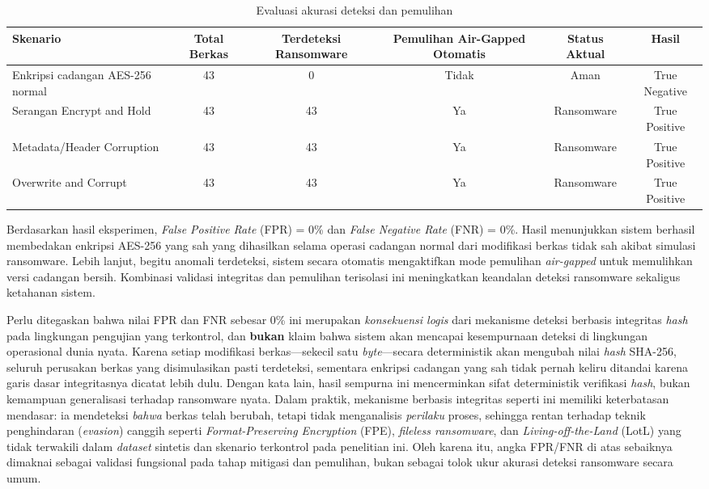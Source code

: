 \documentclass{iaesarticle}
\begin{document}
\begin{table}[H]
\centering
\fontsize{8pt}{10pt}\selectfont
\caption{Evaluasi akurasi deteksi dan pemulihan}
\label{tab:detection_accuracy}
\begin{tabularx}{\textwidth}{@{}X c c c c c@{}}
\hline
\textbf{Skenario} & \textbf{Total Berkas} & \textbf{Terdeteksi Ransomware} & \textbf{Pemulihan Air-Gapped Otomatis} & \textbf{Status Aktual} & \textbf{Hasil} \\
\hline
Enkripsi cadangan AES-256 normal & 43 & 0 & Tidak & Aman & True Negative \\
Serangan Encrypt and Hold & 43 & 43 & Ya & Ransomware & True Positive \\
Metadata/Header Corruption & 43 & 43 & Ya & Ransomware & True Positive \\
Overwrite and Corrupt & 43 & 43 & Ya & Ransomware & True Positive \\
\hline
\end{tabularx}
\end{table}

Berdasarkan hasil eksperimen, \textit{False Positive Rate} (FPR) = 0\% dan \textit{False Negative Rate} (FNR) = 0\%. Hasil menunjukkan sistem berhasil membedakan enkripsi AES-256 yang sah yang dihasilkan selama operasi cadangan normal dari modifikasi berkas tidak sah akibat simulasi ransomware. Lebih lanjut, begitu anomali terdeteksi, sistem secara otomatis mengaktifkan mode pemulihan \textit{air-gapped} untuk memulihkan versi cadangan bersih. Kombinasi validasi integritas dan pemulihan terisolasi ini meningkatkan keandalan deteksi ransomware sekaligus ketahanan sistem.

Perlu ditegaskan bahwa nilai FPR dan FNR sebesar 0\% ini merupakan \textit{konsekuensi logis} dari mekanisme deteksi berbasis integritas \textit{hash} pada lingkungan pengujian yang terkontrol, dan \textbf{bukan} klaim bahwa sistem akan mencapai kesempurnaan deteksi di lingkungan operasional dunia nyata. Karena setiap modifikasi berkas---sekecil satu \textit{byte}---secara deterministik akan mengubah nilai \textit{hash} SHA-256, seluruh perusakan berkas yang disimulasikan pasti terdeteksi, sementara enkripsi cadangan yang sah tidak pernah keliru ditandai karena garis dasar integritasnya dicatat lebih dulu. Dengan kata lain, hasil sempurna ini mencerminkan sifat deterministik verifikasi \textit{hash}, bukan kemampuan generalisasi terhadap ransomware nyata. Dalam praktik, mekanisme berbasis integritas seperti ini memiliki keterbatasan mendasar: ia mendeteksi \textit{bahwa} berkas telah berubah, tetapi tidak menganalisis \textit{perilaku} proses, sehingga rentan terhadap teknik penghindaran (\textit{evasion}) canggih seperti \textit{Format-Preserving Encryption} (FPE), \textit{fileless ransomware}, dan \textit{Living-off-the-Land} (LotL) yang tidak terwakili dalam \textit{dataset} sintetis dan skenario terkontrol pada penelitian ini. Oleh karena itu, angka FPR/FNR di atas sebaiknya dimaknai sebagai validasi fungsional pada tahap mitigasi dan pemulihan, bukan sebagai tolok ukur akurasi deteksi ransomware secara umum.
\end{document}
